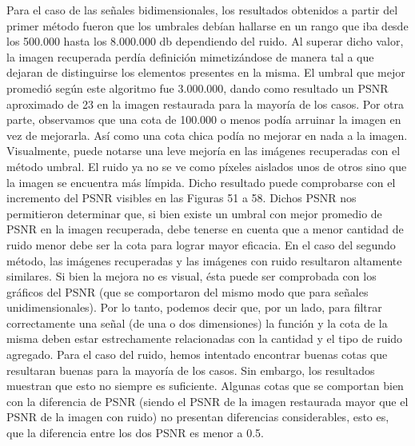 \documentclass[10pt, a4paper]{article}
\begin{document}
\begin{itemize}
Para el caso de las señales bidimensionales, los resultados obtenidos a partir del primer método fueron que los umbrales debían hallarse en un rango que iba desde los 500.000 hasta los 8.000.000 db dependiendo del ruido. Al superar dicho valor, la imagen recuperada perdía definición mimetizándose de manera tal a que dejaran de distinguirse los elementos presentes en la misma.\newline
El umbral que mejor promedió según este algoritmo fue 3.000.000, dando como resultado un PSNR aproximado de 23 en la imagen restaurada para la mayoría de los casos.\newline
Por otra parte, observamos que una cota de 100.000 o menos podía arruinar la imagen en vez de mejorarla. Así como una cota chica podía no mejorar en nada a la imagen.\newline
Visualmente, puede notarse una leve mejoría en las imágenes recuperadas con el método umbral. El ruido ya no se ve como píxeles aislados unos de otros sino que la imagen se encuentra más límpida. Dicho resultado puede comprobarse con el incremento del PSNR visibles en las Figuras 51 a 58.
\newline
Dichos PSNR nos permitieron determinar que, si bien existe un umbral con mejor promedio de PSNR en la imagen recuperada, debe tenerse en cuenta que a menor cantidad de ruido menor debe ser la cota para lograr mayor eficacia.\newline
En el caso del segundo método, las imágenes recuperadas y las imágenes con ruido resultaron altamente similares. Si bien la mejora no es visual, ésta puede ser comprobada con los gráficos del PSNR (que se comportaron del mismo modo que para señales unidimensionales).\newline
\newline
Por lo tanto, podemos decir que, por un lado, para filtrar correctamente una señal (de una o dos dimensiones) la función y la cota de la misma deben estar estrechamente relacionadas con la cantidad y el tipo de ruido agregado. Para el caso del ruido, hemos intentado encontrar buenas cotas que resultaran buenas para la mayoría de los casos. Sin embargo, los resultados muestran que esto no siempre es suficiente. Algunas cotas que se comportan bien con la diferencia de PSNR (siendo el PSNR de la imagen restaurada mayor que el PSNR de la imagen con ruido) no presentan diferencias considerables, esto es, que la diferencia entre los dos PSNR es menor a 0.5.



\end{itemize}
\end{document}
